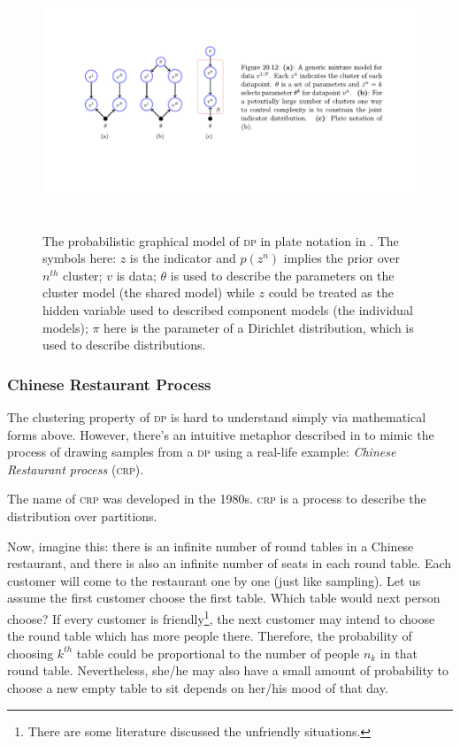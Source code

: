 \documentclass{ar-1col}
\begin{document}
\begin{figure}
    \includegraphics[width=6in, height=3in]{images/Dirichlet.pdf}
    \caption{The probabilistic graphical model of \textsc{dp} in plate notation in \citet{Barber2012}. The symbols here: $z$ is the indicator and $p(z^n)$ implies the prior over $n^{th}$ cluster; $v$ is data; $\theta$ is used to describe the parameters on the cluster model (the shared model) while $z$ could be treated as the hidden variable used to described component models (the individual models); $\pi$ here is the parameter of a Dirichlet distribution, which is used to describe distributions.}
    \label{fig:Dirichlet}
\end{figure}


\subsubsection{Chinese Restaurant Process}

The clustering property of \textsc{dp} is hard to understand simply via mathematical forms above. 
However, there's an intuitive metaphor described in \citet{Teh2006} to mimic the process of drawing samples from a \textsc{dp} using a real-life example: \textit{Chinese Restaurant process} (\textsc{crp}).

The name of \textsc{crp} was developed in the 1980s. 
\textsc{crp} is a process to describe the distribution over partitions.

Now, imagine this: there is an infinite number of round tables in a Chinese restaurant, and there is also an infinite number of seats in each round table. 
Each customer will come to the restaurant one by one (just like sampling). 
Let us assume the first customer choose the first table.
Which table would next person choose?
If every customer is friendly\footnote{There are some literature discussed the unfriendly situations.}, the next customer may intend to choose the round table which has more people there.
Therefore, the probability of choosing $k^{th}$ table could be proportional to the number of people $n_k$ in that round table.
Nevertheless, she/he may also have a small amount of probability to choose a new empty table to sit depends on her/his mood of that day.
\end{document}
